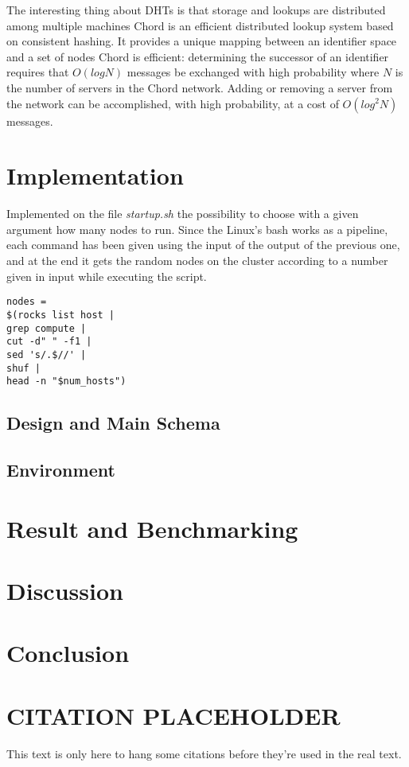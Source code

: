 \documentclass[11pt,conference]{IEEEtran}
\begin{document}
The interesting thing about DHTs is that storage and lookups are distributed among multiple machines \cite{linuxjournal_dht}
Chord is an efficient distributed lookup system based on consistent hashing. It provides a
unique mapping between an identifier space and a set of nodes \cite{citation2}
\newline
Chord is efficient: determining the successor of an identifier requires that $O(log N)$ messages be exchanged with high probability where $N$ is the number of servers in the
Chord network. Adding or removing a server from the network
can be accomplished, with high probability, at a cost of $O(log^2 N)$ messages. \cite{citation2}
\fi


\section{Implementation}

\if
Implemented on the file \textit{startup.sh} the possibility to choose with a given argument how many nodes to run. Since the Linux's bash works as a pipeline, each command has been given using the input of the output of the previous one, and at the end it gets the random nodes on the cluster according to a number given in input while executing the script.
\begin{lstlisting}
nodes = 
$(rocks list host |
grep compute |
cut -d" " -f1 |
sed 's/.$//' |
shuf |
head -n "$num_hosts")
\end{lstlisting}
\fi

\subsection{Design and Main Schema}

\subsection{Environment}



\section{Result and Benchmarking}



\section{Discussion}



\section{Conclusion}


\section{CITATION PLACEHOLDER}

This text is only here to hang some citations before they're used in the real
text.
\cite{linuxjournal_dht}
\cite{citation2}
\cite{citation3}
\cite{citation4}




\end{document}
